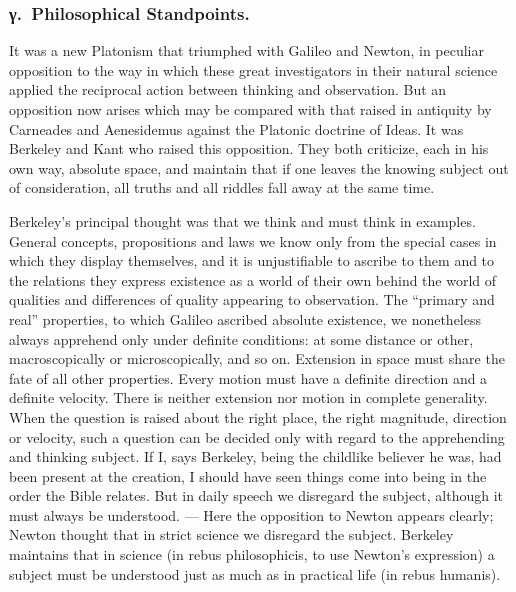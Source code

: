 \documentclass[12pt]{article}
\newcommand{\opage}[1]{\marginnote{\footnotesize\textit{[#1]}}}
\begin{document}
\subsubsection*{γ.~Philosophical Standpoints.}%
%
\label{sec:3d-gamma}%

\noindent It was a new Platonism that triumphed with Galileo and Newton, in
peculiar opposition to the way in which these great investigators in their
natural science applied the reciprocal action between thinking and
observation. But an opposition now arises which may be compared with that
raised in antiquity by Carneades and Aenesidemus against the Platonic
doctrine of Ideas. It was Berkeley and Kant who raised this opposition. They
both criticize, each in his own way, absolute space, and maintain that if
one leaves the knowing subject out of consideration, all truths and all
riddles fall away at the same time.

Berkeley's principal thought was that we think and must think \opage{68}in examples.
General concepts, propositions and laws we know only from the special cases
in which they display themselves, and it is unjustifiable to ascribe to them
and to the relations they express existence as a world of their own behind
the world of qualities and differences of quality appearing to observation.
The ``primary and real'' properties, to which Galileo ascribed absolute
existence, we nonetheless always apprehend only under definite conditions:
at some distance or other, macroscopically or microscopically, and so on.
Extension in space must share the fate of all other properties. Every motion
must have a definite direction and a definite velocity. There is neither
extension nor motion in complete generality. When the question is raised
about the right place, the right magnitude, direction or velocity, such a
question can be decided only with regard to the apprehending and thinking
subject. If I, says Berkeley, being the childlike believer he was, had been
present at the creation, I should have seen things come into being in the
order the Bible relates. But in daily speech we disregard the subject,
although it must always be understood. --- Here the opposition to Newton
appears clearly; Newton thought that in strict science we disregard the
subject. Berkeley maintains that in science (in rebus philosophicis, to use
Newton's expression) a subject must be understood just as much as in
practical life (in rebus humanis).
\end{document}
